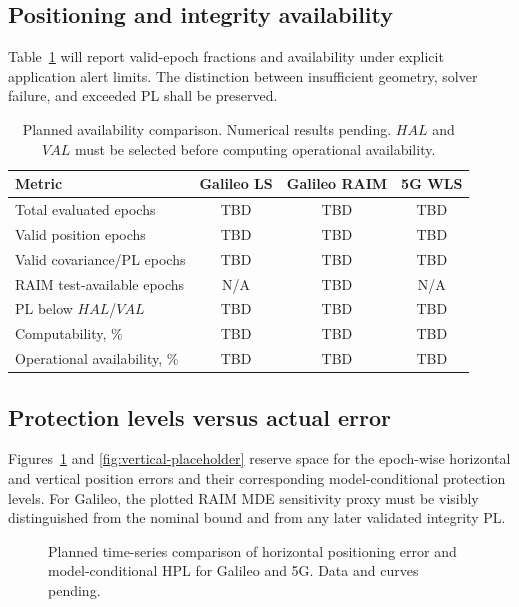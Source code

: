 \documentclass[pdflatex,sn-mathphys-num]{sn-jnl}
\begin{document}
\subsection{Positioning and integrity availability}

Table~\ref{tab:avail-results} will report valid-epoch fractions and
availability under explicit application alert limits. The distinction
between insufficient geometry, solver failure, and exceeded PL shall
be preserved.

\begin{table}[t]
\caption{Planned availability comparison. Numerical results pending.
$HAL$ and $VAL$ must be selected before computing operational availability.}
\label{tab:avail-results}
\begin{tabular}{@{}lccc@{}}
\toprule
Metric & Galileo LS & Galileo RAIM & 5G WLS\\
\midrule
Total evaluated epochs & TBD & TBD & TBD\\
Valid position epochs & TBD & TBD & TBD\\
Valid covariance/PL epochs & TBD & TBD & TBD\\
RAIM test-available epochs & N/A & TBD & N/A\\
PL below $HAL$/$VAL$ & TBD & TBD & TBD\\
Computability, \% & TBD & TBD & TBD\\
Operational availability, \% & TBD & TBD & TBD\\
\bottomrule
\end{tabular}
\end{table}

\subsection{Protection levels versus actual error}

Figures~\ref{fig:horizontal-placeholder} and
\ref{fig:vertical-placeholder} reserve space for the epoch-wise
horizontal and vertical position errors and their corresponding
model-conditional protection levels. For Galileo, the plotted
RAIM MDE sensitivity proxy must be visibly distinguished from the
nominal bound and from any later validated integrity PL.

\begin{figure}[t]
\centering
{}
\caption{Planned time-series comparison of horizontal positioning error and
model-conditional HPL for Galileo and 5G. Data and curves pending.}
\label{fig:horizontal-placeholder}
\end{figure}
\end{document}
